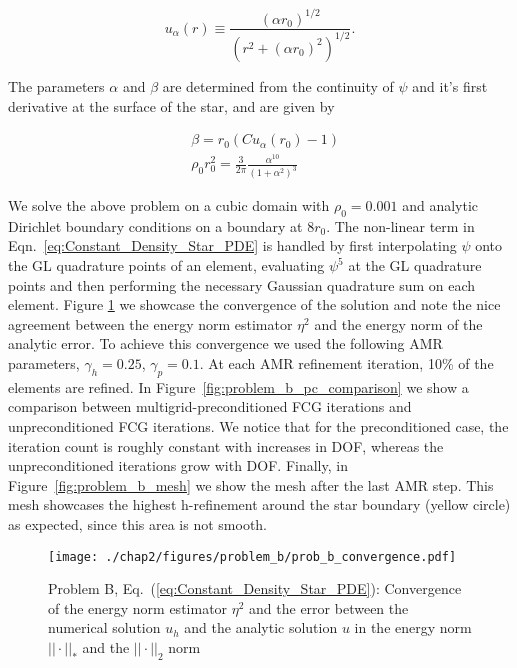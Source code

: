 \begin{equation}
u_{\alpha}(r) \equiv \frac{(\alpha r_0)^{1/2}}{(r^{2} + (\alpha r_0)^{2})^{1/2}}.
\end{equation}

The parameters $\alpha$ and $\beta$ are determined from the continuity of $\psi$ and it's first derivative at the surface of the star, and are given by

\begin{align}
 &\beta = r_0(Cu_{\alpha}(r_0) - 1) \\
 &\rho_{0}r_0^{2} = \frac{3}{2\pi}\frac{\alpha^{10}}{(1+\alpha^{2})^{3}}
\end{align}

We solve the above problem on a cubic domain with $\rho_0 =
0.001$ and analytic Dirichlet boundary conditions on a boundary at
$8r_0$. The non-linear term in Eqn.~\ref{eq:Constant_Density_Star_PDE} is handled by first interpolating $\psi$ onto the GL quadrature points of an element, evaluating $\psi^{5}$ at the GL quadrature points and then performing the necessary Gaussian quadrature sum on each element.
Figure \ref{fig:problem_b_convergence} we showcase the
convergence of the solution and note the nice agreement between the
energy norm estimator $\eta^2$ and the energy norm of the analytic
error. To achieve this convergence we used the following AMR parameters, $\gamma_h = 0.25$, $\gamma_p = 0.1$.  At each AMR refinement iteration, 10\% of the elements are refined. In Figure~\ref{fig:problem_b_pc_comparison} we show a comparison between multigrid-preconditioned FCG iterations and unpreconditioned FCG iterations. We notice that for the preconditioned case, the iteration count is roughly constant with increases in DOF, whereas the unpreconditioned iterations grow with DOF. Finally, in Figure~\ref{fig:problem_b_mesh} we show the mesh after the last AMR step. This mesh showcases the highest h-refinement around the star boundary (yellow circle) as expected, since this area is not smooth. 
 
\begin{figure}
  \centering
  \texttt{[image: ./chap2/figures/problem\_b/prob\_b\_convergence.pdf]}
  \caption{Problem B, Eq.~(\ref{eq:Constant_Density_Star_PDE}): Convergence of the energy norm estimator $\eta^2$ and the error between the numerical solution $u_h$ and the analytic solution $u$ in the energy norm $||\cdot||_*$ and the $||\cdot||_2$ norm}
  \label{fig:problem_b_convergence} 
\end{figure}

